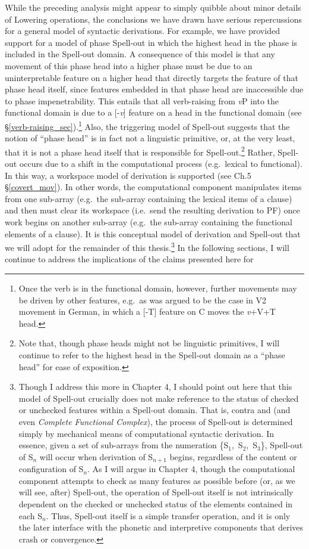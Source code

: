 \noindent
While the preceding analysis might appear to simply quibble about minor details of Lowering operations, the conclusions we have drawn have serious repercussions for a general model of syntactic derivations. For example, we have provided support for a model of phase Spell-out in which the highest head in the phase is included in the Spell-out domain. A consequence of this model is that any movement of this phase head into a higher phase must be due to an uninterpretable feature on a higher head that directly targets the feature of that phase head itself, since features embedded in that phase head are inaccessible due to phase impenetrability. This entails that all verb-raising from {\it v}P into the functional domain is due to a [-{\it v}] feature on a head in the functional domain (see \S\ref{verb-raising_sec}).\footnote{Once the verb is in the functional domain, however, further movements may be driven by other features, e.g.\ as was argued to be the case in V2 movement in German, in which a [-T] feature on C moves the {\it v}+V+T head.} Also, the triggering model of Spell-out suggests that the notion of ``phase head'' is in fact not a linguistic primitive, or, at the very least, that it is not a phase head itself that is responsible for Spell-out.\footnote{Note that, though phase heads might not be linguistic primitives, I will continue to refer to the highest head in the Spell-out domain as a ``phase head'' for ease of exposition.} Rather, Spell-out occurs due to a shift in the computational process (e.g.\ lexical to functional). In this way, a workspace model of derivation is supported (see Ch.5 \S\ref{covert_mov}). In other words, the computational component manipulates items from one sub-array (e.g.\ the sub-array containing the lexical items of a clause) and then must clear its workspace (i.e.\ send the resulting derivation to PF) once work begins on another sub-array (e.g.\ the sub-array containing the functional elements of a clause). It is this conceptual model of derivation and Spell-out that we will adopt for the remainder of this thesis.\footnote{Though I address this more in Chapter 4, I should point out here that this model of Spell-out crucially does not make reference to the status of checked or unchecked features within a Spell-out domain. That is, contra \citet{felser2003} and \citet{svenonius2004} (and even  {\it Complete Functional Complex}), the process of Spell-out is determined simply by mechanical means of computational syntactic derivation. In essence, given a set of sub-arrays from the numeration \{S$_{1}$,~S$_{2}$,~S$_{3}$\}, Spell-out of S$_{n}$ will occur when derivation of S$_{n+1}$ begins, regardless of the content or configuration of S$_{n}$. As I will argue in Chapter 4, though the computational component attempts to check as many features as possible before (or, as we will see, after) Spell-out, the operation of Spell-out itself is not intrinsically dependent on the checked or unchecked status of the elements contained in each S$_{n}$. Thus, Spell-out itself is a simple transfer operation, and it is only the later interface with the phonetic and interpretive components that derives crash or convergence.} In the following sections, I will continue to address the implications of the claims presented here for 